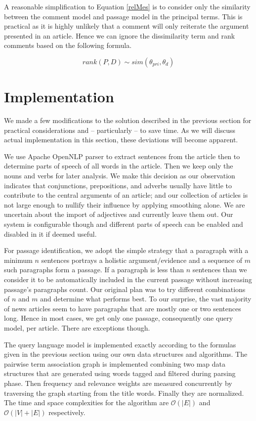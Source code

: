 \documentclass[article]{IEEEtran}
\begin{document}
A reasonable simplification to Equation \ref{relMes} is to consider only the similarity between the comment model and passage model in the principal terms. This is practical as it is highly unlikely that a comment will only reiterate the argument presented in an article. Hence we can ignore the dissimilarity term and rank comments based on the following formula.

\begin{equation}
\label{rank}
rank(P,D) \sim sim(\theta_{pri}, \theta_d)
\end{equation} 

\section{Implementation}
\label{si}
We made a few modifications to the solution described in the previous section for practical considerations and -- particularly -- to save time. As we will discuss actual implementation in this section, these deviations will become apparent.   

We use Apache OpenNLP parser \cite{openNLP} to extract sentences from the article then to determine parts of speech of all words in the article. Then we keep only the nouns and verbs for later analysis. We make this decision as our observation indicates that conjunctions, prepositions, and adverbs usually have little to contribute to the central arguments of an article; and our collection of articles is not large enough to nullify their influence by applying smoothing alone. We are uncertain about the import of adjectives and currently leave them out. Our system is configurable though and different parts of speech can be enabled and disabled in it if deemed useful.

For passage identification, we adopt the simple strategy that a paragraph with a minimum $n$ sentences portrays a holistic argument/evidence and a sequence of $m$ such paragraphs form a passage. If a paragraph is less than $n$ sentences than we consider it to be automatically included in the current passage without increasing passage's paragraphs count. Our original plan was to try different combinations of $n$ and $m$ and determine what performs best. To our surprise, the vast majority of news articles seem to have paragraphs that are mostly one or two sentences long. Hence in most cases, we get only one passage, consequently one query model, per article. There are exceptions though.                     

The query language model is implemented exactly according to the formulas given in the previous section using our own data structures and algorithms. The pairwise term association graph is implemented combining two map data structures that are generated using words tagged and filtered during parsing phase. Then frequency and relevance weights are measured concurrently by traversing the graph starting from the title words. Finally they are normalized. The time and space complexities for the algorithm are $\mathcal{O}(|E|)$ and $\mathcal{O}(|V| + |E|)$ respectively.
\end{document}
